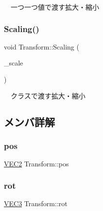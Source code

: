 　一つ一つ値で渡す拡大・縮小 

\mbox{\label{class_transform_ad98a664586fb6546bdfb02d18c0578cb}} 
\subsubsection{\texorpdfstring{Scaling()}{Scaling()}\hspace{0.1cm}{\footnotesize\ttfamily [2/2]}}
{\footnotesize\ttfamily void Transform\+::\+Scaling (\begin{DoxyParamCaption}\item[{const \mbox{\hyperlink{transform_8h_afb0c5e21d4133ff4f200992c0b534e1b}{V\+E\+C2}} \&}]{\+\_\+scale }\end{DoxyParamCaption})}



　クラスで渡す拡大・縮小 



\subsection{メンバ詳解}
\mbox{\label{class_transform_a25bce2389cc280e8adf193bdbb00d94a}} 
\subsubsection{\texorpdfstring{pos}{pos}}
{\footnotesize\ttfamily \mbox{\hyperlink{transform_8h_afb0c5e21d4133ff4f200992c0b534e1b}{V\+E\+C2}} Transform\+::pos}

\mbox{\label{class_transform_a37866af878aeb2fd7b30a375d2227e68}} 
\subsubsection{\texorpdfstring{rot}{rot}}
{\footnotesize\ttfamily \mbox{\hyperlink{transform_8h_a7e10f09694869ec22cb183f13a59289c}{V\+E\+C3}} Transform\+::rot}

\mbox{\label{class_transform_a5dbda48cf294803797eccb79d1f833b7}} 
